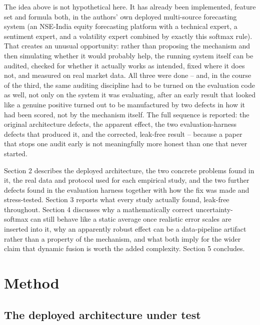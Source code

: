 \documentclass[10pt,a4paper,twocolumn]{article}
\begin{document}
The idea above is not hypothetical here. It has already been implemented, feature set and formula both, in the authors' own deployed multi-source forecasting system (an NSE-India equity forecasting platform with a technical expert, a sentiment expert, and a volatility expert combined by exactly this softmax rule). That creates an unusual opportunity: rather than proposing the mechanism and then simulating whether it would probably help, the running system itself can be audited, checked for whether it actually works as intended, fixed where it does not, and measured on real market data. All three were done -- and, in the course of the third, the same auditing discipline had to be turned on the evaluation code as well, not only on the system it was evaluating, after an early result that looked like a genuine positive turned out to be manufactured by two defects in how it had been scored, not by the mechanism itself. The full sequence is reported: the original architecture defects, the apparent effect, the two evaluation-harness defects that produced it, and the corrected, leak-free result -- because a paper that stops one audit early is not meaningfully more honest than one that never started.

Section 2 describes the deployed architecture, the two concrete problems found in it, the real data and protocol used for each empirical study, and the two further defects found in the evaluation harness together with how the fix was made and stress-tested. Section 3 reports what every study actually found, leak-free throughout. Section 4 discusses why a mathematically correct uncertainty-softmax can still behave like a static average once realistic error scales are inserted into it, why an apparently robust effect can be a data-pipeline artifact rather than a property of the mechanism, and what both imply for the wider claim that dynamic fusion is worth the added complexity. Section 5 concludes.

\section{Method}

\subsection{The deployed architecture under test}
\end{document}
